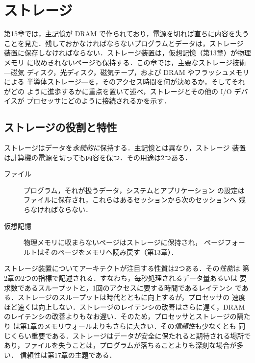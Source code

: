 \documentclass[../main.tex]{subfiles}
\begin{document}
\chapter{ストレージ}

第15章では，主記憶が DRAM で作られており，電源を切れば直ちに内容を失う
ことを見た．残しておかなければならないプログラムとデータは，ストレージ
装置に保存しなければならない．ストレージ装置は，仮想記憶（第13章）が物理メモリ
に収めきれないページも保持する．この章では，主要なストレージ技術---磁気
ディスク，光ディスク，磁気テープ，および DRAM やフラッシュメモリによる
半導体ストレージ---を，そのアクセス時間を何が決めるか，そしてそれがどの
ように進歩するかに重点を置いて述べ，ストレージとその他の I/O デバイスが
プロセッサにどのように接続されるかを示す．

\section{ストレージの役割と特性}
\label{sec:l16-storage}

ストレージはデータを\emph{永続的に}保持する．主記憶とは異なり，ストレージ
装置は計算機の電源を切っても内容を保つ．その用途は2つある．
\begin{description}
  \item[ファイル] プログラム，それが扱うデータ，システムとアプリケーション
    の設定はファイルに保存され，これらはあるセッションから次のセッションへ
    残らなければならない．
  \item[仮想記憶] 物理メモリに収まらないページはストレージに保持され，
    ページフォールトはそのページをメモリへ読み戻す（第13章）．
\end{description}

ストレージ装置についてアーキテクトが注目する性質は2つある．その\emph{性能}は
第2章の2つの指標で記述される．すなわち，毎秒処理されるデータ量あるいは
要求数であるスループットと，1回のアクセスに要する時間であるレイテンシ
である．ストレージのスループットは時代とともに向上するが，プロセッサの
速度ほど速くは向上しない．ストレージのレイテンシの改善はさらに遅く，DRAM
のレイテンシの改善よりもなお遅い．そのため，プロセッサとストレージの隔たり
は第1章のメモリウォールよりもさらに大きい．その\emph{信頼性}も少なくとも
同じくらい重要である．ストレージはデータが安全に保たれると期待される場所で
あり，ファイルを失うことは，プログラムが落ちることよりも深刻な場合が多い．
信頼性は第17章の主題である．
\end{document}

